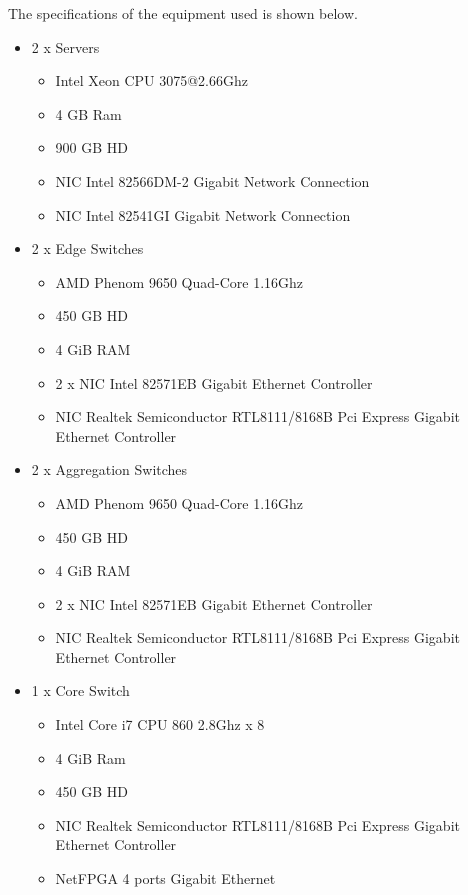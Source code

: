 \documentclass[12pt,english,oneside]{book}
\begin{document}
The specifications of the equipment used is shown below.
\begin{itemize}
  \item 2 x Servers
    \begin{itemize}
      \item Intel Xeon CPU 3075@2.66Ghz
      \item 4 GB Ram
      \item 900 GB HD
      \item NIC Intel 82566DM-2 Gigabit Network Connection
      \item NIC Intel 82541GI Gigabit Network Connection
    \end{itemize}
  \item 2 x Edge Switches
    \begin{itemize}
      \item AMD Phenom 9650 Quad-Core \@ 1.16Ghz
      \item 450 GB HD
      \item 4 GiB RAM
      \item 2 x NIC Intel 82571EB Gigabit Ethernet Controller
      \item NIC Realtek Semiconductor RTL8111/8168B Pci Express Gigabit Ethernet Controller
    \end{itemize}
  \item 2 x Aggregation Switches
    \begin{itemize}
      \item AMD Phenom 9650 Quad-Core \@ 1.16Ghz
      \item 450 GB HD
      \item 4 GiB RAM
      \item 2 x NIC Intel 82571EB Gigabit Ethernet Controller
      \item NIC Realtek Semiconductor RTL8111/8168B Pci Express Gigabit Ethernet Controller
    \end{itemize}

    \item 1 x Core Switch
    \begin{itemize}
      \item Intel Core i7 CPU 860 \@ 2.8Ghz x 8 
      \item 4 GiB Ram
      \item 450 GB HD
      \item NIC Realtek Semiconductor RTL8111/8168B Pci Express Gigabit Ethernet Controller
      \item NetFPGA 4 ports Gigabit Ethernet
    \end{itemize}


\end{itemize}
\end{document}
